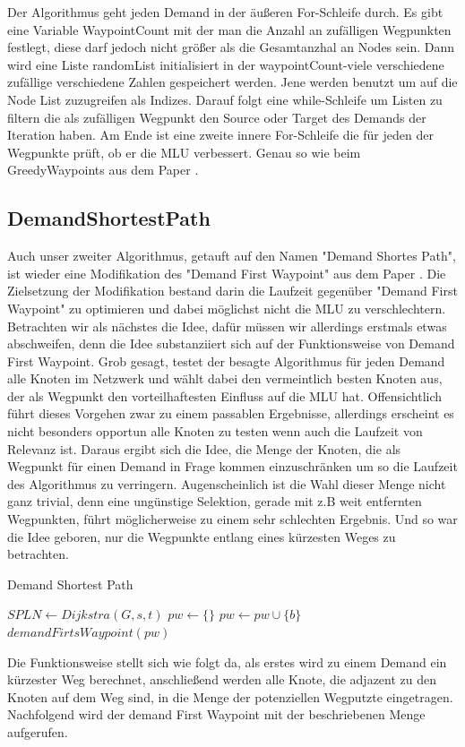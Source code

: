 \documentclass[sigconf,noacm,review]{acmart}
\begin{document}
Der Algorithmus geht jeden Demand in der äußeren For-Schleife durch. Es gibt eine Variable WaypointCount mit der man die Anzahl an zufälligen Wegpunkten festlegt, diese darf jedoch nicht größer als die Gesamtanzhal an Nodes sein. Dann wird eine Liste randomList initialisiert in der waypointCount-viele verschiedene zufällige verschiedene Zahlen gespeichert werden. Jene werden benutzt um auf die Node List zuzugreifen als Indizes. Darauf folgt eine while-Schleife um Listen zu filtern die als zufälligen Wegpunkt den Source oder Target des Demands der Iteration haben. Am Ende ist eine zweite innere For-Schleife die für jeden der Wegpunkte prüft, ob er die MLU verbessert. Genau so wie beim GreedyWaypoints aus dem Paper \cite{10.1145/3485983.3494846}.

\subsection{DemandShortestPath}
Auch unser zweiter Algorithmus, getauft auf den Namen "Demand Shortes Path", ist wieder eine Modifikation des "Demand First Waypoint" aus dem Paper \cite{10.1145/3485983.3494846}. Die Zielsetzung der Modifikation bestand darin die Laufzeit gegenüber "Demand First Waypoint" zu optimieren und dabei möglichst nicht die MLU zu verschlechtern.\\
Betrachten wir als nächstes die Idee, dafür müssen wir allerdings erstmals etwas abschweifen, denn die Idee substanziiert sich auf der Funktionsweise von Demand First Waypoint. Grob gesagt, testet der besagte Algorithmus für jeden Demand alle Knoten im Netzwerk und wählt dabei den vermeintlich besten Knoten aus, der als Wegpunkt den vorteilhaftesten Einfluss auf die MLU hat. Offensichtlich führt dieses Vorgehen zwar zu einem passablen Ergebnisse, allerdings erscheint es nicht besonders opportun alle Knoten zu testen wenn auch die Laufzeit von Relevanz ist.
Daraus ergibt sich die Idee, die Menge der Knoten, die als Wegpunkt für einen Demand in Frage kommen einzuschränken um so die Laufzeit des Algorithmus zu verringern. Augenscheinlich ist die Wahl dieser Menge nicht ganz trivial, denn eine ungünstige Selektion, gerade mit z.B weit entfernten Wegpunkten, führt möglicherweise zu einem sehr schlechten Ergebnis. Und so war die Idee geboren, nur die Wegpunkte entlang eines kürzesten Weges zu betrachten.
\begin{algorithm}[hbt!]
\caption{Demand Shortest Path}\label{alg:cap}
\begin{algorithmic}[1]
        \STATE $SPLN \gets Dijkstra(G,s,t)$
        \STATE $pw \gets \{ \}$
                \STATE $pw \gets pw \cup \{b\}$
            \ENDFOR
        \ENDFOR
        \STATE $demandFirtsWaypoint(pw)$
    \ENDFOR
\end{algorithmic}
\end{algorithm}
Die Funktionsweise stellt sich wie folgt da, als erstes wird zu einem Demand ein kürzester Weg berechnet, anschließend werden alle Knote, die adjazent zu den Knoten auf dem Weg sind, in die Menge der potenziellen Wegputzte eingetragen. Nachfolgend wird der demand First Waypoint mit der beschriebenen Menge aufgerufen.
\end{document}
